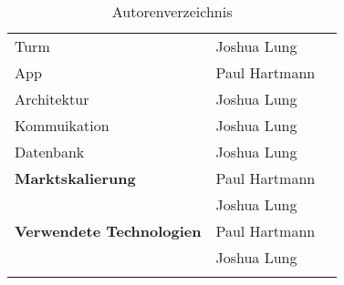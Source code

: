 \begin{longtable}{llr}
  Turm                              & Joshua Lung    &                 \\
  App                               & Paul Hartmann  &                 \\
  Architektur                       & Joshua Lung    &                 \\
  Kommuikation                      & Joshua Lung    &                 \\
  Datenbank                         & Joshua Lung    &                 \\
  \midrule
  \textbf{Marktskalierung}          & Paul Hartmann &                 \\
                                    & Joshua Lung    &                 \\
  \midrule
  \textbf{Verwendete Technologien}  & Paul Hartmann  &                 \\
                                    & Joshua Lung    &                 \\
  \bottomrule

  \caption{Autorenverzeichnis}
  \label{tab:autorenverzeichnis}
\end{longtable}





